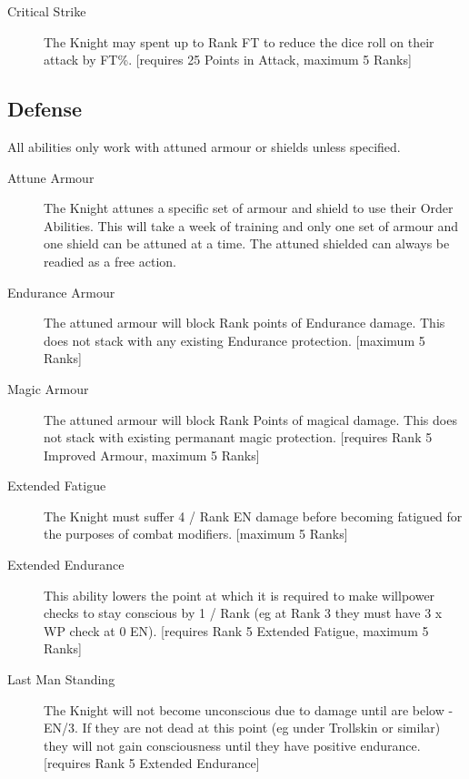 \documentclass[a4paper]{article}
\begin{document}
\begin{multicols*}{3}
\begin{description}
\item[Critical Strike] The Knight may spent up to Rank FT to reduce
  the dice roll on their attack by FT\%.  [requires 25 Points in
    Attack, maximum 5 Ranks]

\end{description}

\subsection{Defense}

All abilities only work with attuned armour or shields unless specified.

\begin{description}

\item[Attune Armour] The Knight attunes a specific set of armour and
  shield to use their Order Abilities.  This will take a week of
  training and only one set of armour and one shield can be attuned at
  a time.  The attuned shielded can always be readied as a free
  action.

\item[Endurance Armour] The attuned armour will block Rank points of
  Endurance damage.  This does not stack with any existing Endurance
  protection.  [maximum 5 Ranks]

\item[Magic Armour] The attuned armour will block Rank Points of
  magical damage.  This does not stack with existing permanant magic
  protection.  [requires Rank 5 Improved Armour, maximum 5 Ranks]

\item[Extended Fatigue] The Knight must suffer 4 / Rank EN damage
  before becoming fatigued for the purposes of combat
  modifiers.  [maximum 5 Ranks]

\item[Extended Endurance] This ability lowers the point at which it is
  required to make willpower checks to stay conscious by 1 / Rank (eg
  at Rank 3 they must have 3 x WP check at 0 EN).  [requires Rank 5
    Extended Fatigue, maximum 5 Ranks]

\item[Last Man Standing] The Knight will not become unconscious due to
  damage until are below -EN/3.  If they are not dead at this point
  (eg under Trollskin or similar) they will not gain consciousness
  until they have positive endurance.  [requires Rank 5 Extended
    Endurance]


\end{description}
\end{multicols*}
\end{document}
